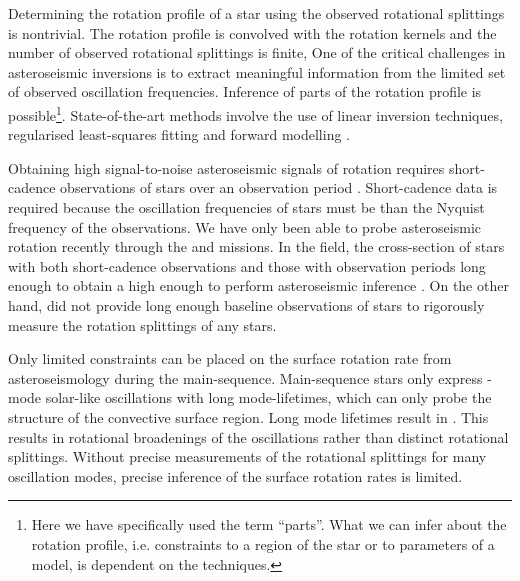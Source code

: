 Determining the rotation profile of a star using the observed rotational splittings is nontrivial. The rotation profile is convolved with the rotation kernels and the number of observed rotational splittings is finite,
One of the critical challenges in asteroseismic inversions is to extract meaningful information from the limited set of observed oscillation frequencies. Inference of parts of the rotation profile is possible\footnote{Here we have specifically used the term “parts”. What we can infer about the rotation profile, i.e. constraints to a region of the star or to parameters of a model, is dependent on the techniques.}.
State-of-the-art methods involve the use of linear inversion techniques, regularised least-squares fitting and forward modelling \citep[see, e.g.][ for thorough discussion of these techniques]{christensen-dalsgaard_comparison_1990, christensen-dalsgaard_generalized_1993,aerts_asteroseismology_2010}.

Obtaining high signal-to-noise asteroseismic signals of rotation requires short-cadence observations of stars over an observation period  \citep{deheuvels_seismic_2014}.
Short-cadence data is required because the oscillation frequencies of stars must be  than the Nyquist frequency of the observations.
We have only been able to probe asteroseismic rotation recently through the \kepler{} and \ktoo{} missions.
In the \kepler{} field, the cross-section of stars with both short-cadence observations and those with observation periods long enough to obtain a high enough  to perform asteroseismic inference .
On the other hand, \ktoo{} did not provide long enough baseline observations of stars to rigorously measure the rotation splittings of any stars.

Only limited constraints can be placed on the surface rotation rate from asteroseismology during the main-sequence.
Main-sequence stars only express -mode solar-like oscillations with long mode-lifetimes, which can only probe the structure of the convective surface region.
Long mode lifetimes result in .
This results in rotational broadenings of the oscillations rather than distinct rotational splittings.
Without precise measurements of the rotational splittings for many oscillation modes, precise inference of the surface rotation rates is limited.

